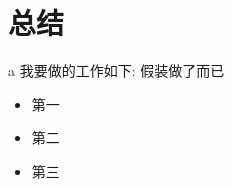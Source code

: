 \section{总结}
\begin{frame}{a}
	我要做的工作如下: 假装做了而已
	\vspace{1em}
	\begin{itemize}
		\setlength\itemsep{1em}
		\item 第一
		\item 第二
		\item 第三
	\end{itemize}	
\end{frame}
\begin{frame}
	\begin{figure}
		\vspace{2em}
		\centering
		\resizebox{1.0\textwidth}{!}{}
	\end{figure}
\end{frame}

